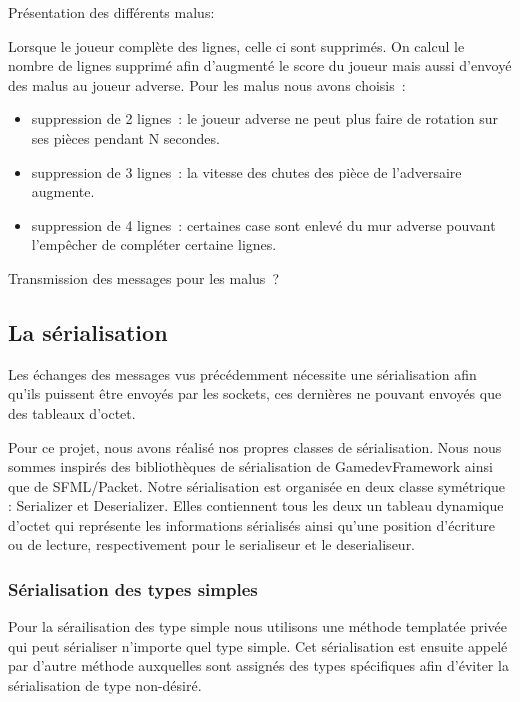 \documentclass[a4paper, 12pt]{article}
\begin{document}
			Présentation des différents malus:

			Lorsque le joueur complète des lignes, celle ci sont supprimés. On calcul le nombre de lignes supprimé afin d’augmenté le score du joueur mais aussi d’envoyé des malus au joueur adverse.
			Pour les malus nous avons choisis : 

			\begin{itemize}
				\item suppression de 2 lignes : le joueur adverse ne peut plus faire de rotation sur ses pièces pendant N secondes.
				\item suppression de 3 lignes : la vitesse des chutes des pièce de l’adversaire augmente.
				\item suppression de 4 lignes : certaines case sont enlevé du mur adverse pouvant l’empêcher de compléter certaine lignes.
			\end{itemize}

			Transmission des messages pour les malus ?






	\subsection{La sérialisation}

		Les échanges des messages vus précédemment nécessite une sérialisation afin qu'ils puissent être envoyés par les sockets, ces dernières ne pouvant envoyés que des tableaux d'octet.


		Pour ce projet, nous avons réalisé nos propres classes de sérialisation. Nous nous sommes inspirés des bibliothèques de sérialisation de GamedevFramework ainsi que de SFML/Packet. 
		Notre sérialisation est organisée en deux classe symétrique : Serializer et Deserializer. Elles contiennent tous les deux un tableau dynamique d'octet qui représente les informations sérialisés ainsi qu'une position d'écriture ou de lecture, respectivement pour le serialiseur et le deserialiseur. 
		
		\subsubsection{Sérialisation des types simples}

		Pour la sérailisation des type simple nous utilisons une méthode templatée privée qui peut sérialiser n'importe quel type simple. Cet sérialisation est ensuite appelé par d'autre méthode auxquelles sont assignés des types spécifiques afin d'éviter la sérialisation de type non-désiré.
\end{document}
